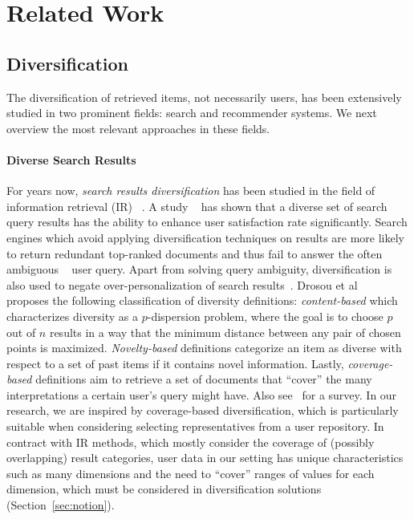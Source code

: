 \section{Related Work}
\label{sec:related}

\subsection{Diversification}
\label{sec:div}
The diversification of retrieved items, not necessarily users, has been extensively studied in two prominent fields: search and recommender systems. We next overview the most relevant approaches in these fields.

\paragraph*{Diverse Search Results}
For years now, \emph{search results diversification} has been  studied in the field of information retrieval (IR)  ~\cite{servajean2013profile,AgrawalGHI09,carbonell1998MMR}. A study ~\cite{vee2008efficientdiv} has shown that a diverse set of search query results has the ability to enhance user satisfaction rate significantly. Search engines which avoid applying diversification techniques on results are more likely to return redundant top-ranked documents and thus fail to answer the often ambiguous ~\cite{anagon2005sampling} user query. Apart from solving query ambiguity, diversification is also used to negate over-personalization of search results~\cite{radlinskiD20006persondiv}.
Drosou et al ~\cite{drosou2010search} proposes the following classification of diversity definitions: \emph{content-based} which characterizes diversity as a $p$-dispersion problem, where the goal is to choose $p$ out of $n$ results in a way that the minimum distance between any pair of chosen points is maximized. \emph{Novelty-based} definitions categorize an item as diverse with respect to a set of past items if it contains novel information. Lastly, \emph{coverage-based} definitions aim to retrieve a set of documents that ``cover'' the many interpretations a certain user's query might have. Also see~\cite{zheng2012coverage} for a survey. In our research, we are inspired by coverage-based diversification, which is particularly suitable when considering selecting representatives from a user repository. In contract with IR methods, which mostly consider the coverage of (possibly overlapping) result categories, user data in our setting has unique characteristics such as many dimensions and the need to ``cover'' ranges of values for each dimension, which must be considered in diversification solutions (Section~\ref{sec:notion}).

